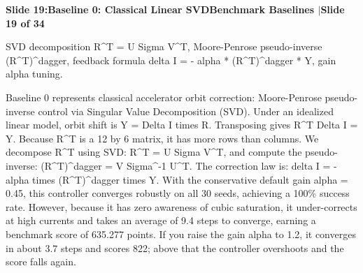 \documentclass[11pt,a4paper]{article}
\begin{document}
\clearpage
\hypertarget{slide.19}{}
{}
\noindent\begin{tcolorbox}[colback=navy,colframe=navy,left=6pt,right=6pt,top=3pt,bottom=3pt,boxrule=0pt,arc=2pt]
{\large\bfseries\color{white}Slide 19:\enspace Baseline 0: Classical Linear SVD}\hfill{\footnotesize\bfseries\color{white!85!lightbg}Benchmark Baselines \enspace$|$\enspace Slide 19 of 34}
\end{tcolorbox}
\vspace{0.2em}
\begin{tcolorbox}[colback=lightbg,colframe=bordergray,title={\footnotesize\bfseries\color{darkgray}Slide Visual Blueprint},fontupper=\small,left=6pt,right=6pt,top=2.5pt,bottom=2.5pt,boxrule=0.6pt,arc=2.5pt]
SVD decomposition R\textasciicircum{}T = U Sigma V\textasciicircum{}T, Moore-Penrose pseudo-inverse (R\textasciicircum{}T)\textasciicircum{}dagger, feedback formula delta I = - alpha * (R\textasciicircum{}T)\textasciicircum{}dagger * Y, gain alpha tuning.
\end{tcolorbox}
\vspace{0.2em}
\begin{tcolorbox}[colback=white,colframe=primaryblue,title={\footnotesize\bfseries\color{white}Spoken Presenter Script},fontupper=\small,left=6pt,right=6pt,top=3pt,bottom=3pt,boxrule=0.8pt,arc=2.5pt]
Baseline 0 represents classical accelerator orbit correction: Moore-Penrose pseudo-inverse control via Singular Value Decomposition (SVD). Under an idealized linear model, orbit shift is Y = Delta I times R. Transposing gives R\textasciicircum{}T Delta I = Y. Because R\textasciicircum{}T is a 12 by 6 matrix, it has more rows than columns. We decompose R\textasciicircum{}T using SVD: R\textasciicircum{}T = U Sigma V\textasciicircum{}T, and compute the pseudo-inverse: (R\textasciicircum{}T)\textasciicircum{}dagger = V Sigma\textasciicircum{}-1 U\textasciicircum{}T. The correction law is: delta I = - alpha times (R\textasciicircum{}T)\textasciicircum{}dagger times Y. With the conservative default gain alpha = 0.45, this controller converges robustly on all 30 seeds, achieving a 100\% success rate. However, because it has zero awareness of cubic saturation, it under-corrects at high currents and takes an average of 9.4 steps to converge, earning a benchmark score of 635.277 points. If you raise the gain alpha to 1.2, it converges in about 3.7 steps and scores 822; above that the controller overshoots and the score falls again.
\end{tcolorbox}
\end{document}
